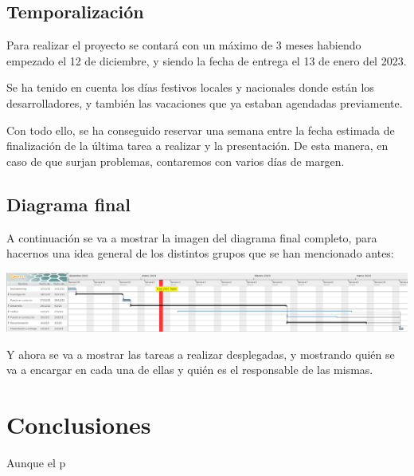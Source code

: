 \documentclass{\ClassPath/viu-tfm-template}
\begin{document}
\section{Temporalización}
Para realizar el proyecto se contará con un máximo de 3 meses habiendo empezado el 12 de diciembre, y siendo la fecha de entrega el 13 de enero del 2023.

Se ha tenido en cuenta los días festivos locales y nacionales donde están los desarrolladores, y también las vacaciones que ya estaban agendadas previamente.

Con todo ello, se ha conseguido reservar una semana entre la fecha estimada de finalización de la última tarea a realizar y la presentación. De esta manera, en caso de que surjan problemas, contaremos con varios días de margen.

\section{Diagrama final}

A continuación se va a mostrar la imagen del diagrama final completo, para hacernos una idea general de los distintos grupos que se han mencionado antes:

\begin{center}
    \includegraphics[frame,width=\linewidth]{img/diagrama.png}
\end{center}


Y ahora se va a mostrar las tareas a realizar desplegadas, y mostrando quién se va a encargar en cada una de ellas y quién es el responsable de las mismas.



\chapter{Conclusiones}

Aunque el p
\end{document}
